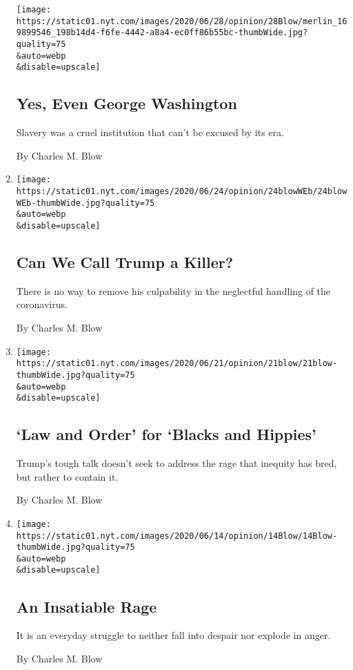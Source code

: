 \begin{enumerate}
  \texttt{[image: https://static01.nyt.com/images/2020/06/28/opinion/28Blow/merlin\_169899546\_198b14d4-f6fe-4442-a8a4-ec0ff86b55bc-thumbWide.jpg?quality=75\\\&auto=webp\\\&disable=upscale]}

  \hypertarget{yes-even-george-washington}{%
  \subsection{Yes, Even George
  Washington}\label{yes-even-george-washington}}

  Slavery was a cruel institution that can't be excused by its era.

  By Charles M. Blow
\item
  \href{/2020/06/24/opinion/trump-coronavirus-deaths.html}{}

  \texttt{[image: https://static01.nyt.com/images/2020/06/24/opinion/24blowWEb/24blowWEb-thumbWide.jpg?quality=75\\\&auto=webp\\\&disable=upscale]}

  \hypertarget{can-we-call-trump-a-killer}{%
  \subsection{Can We Call Trump a
  Killer?}\label{can-we-call-trump-a-killer}}

  There is no way to remove his culpability in the neglectful handling
  of the coronavirus.

  By Charles M. Blow
\item
  \href{/2020/06/21/opinion/trump-police-reform.html}{}

  \texttt{[image: https://static01.nyt.com/images/2020/06/21/opinion/21blow/21blow-thumbWide.jpg?quality=75\\\&auto=webp\\\&disable=upscale]}

  \hypertarget{law-and-order-for-blacks-and-hippies}{%
  \subsection{`Law and Order' for `Blacks and
  Hippies'}\label{law-and-order-for-blacks-and-hippies}}

  Trump's tough talk doesn't seek to address the rage that inequity has
  bred, but rather to contain it.

  By Charles M. Blow
\item
  \href{/2020/06/14/opinion/us-protests-racism.html}{}

  \texttt{[image: https://static01.nyt.com/images/2020/06/14/opinion/14Blow/14Blow-thumbWide.jpg?quality=75\\\&auto=webp\\\&disable=upscale]}

  \hypertarget{an-insatiable-rage}{%
  \subsection{An Insatiable Rage}\label{an-insatiable-rage}}

  It is an everyday struggle to neither fall into despair nor explode in
  anger.

  By Charles M. Blow
\end{enumerate}

